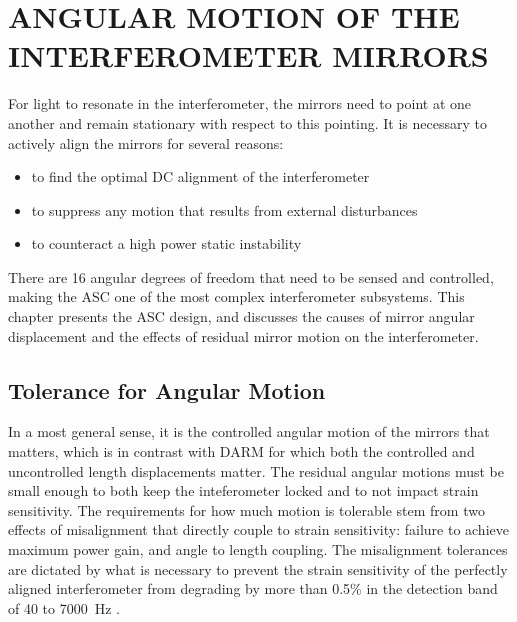 \chapter{ANGULAR MOTION OF THE INTERFEROMETER MIRRORS}

For light to resonate in the interferometer, the mirrors need to point at one another and remain stationary with respect to this pointing. It is necessary to actively align the mirrors for several reasons:
\begin{itemize}
\item to find the optimal DC alignment of the interferometer \vspace{-10 pt}
\item to suppress any motion that results from external disturbances \vspace{-10 pt}
\item to counteract a high power static instability
\end{itemize}
There are 16 angular degrees of freedom that need to be sensed and controlled, making the ASC one of the most complex interferometer subsystems. This chapter presents the ASC design, and discusses the causes of mirror angular displacement and the effects of residual mirror motion on the interferometer. 












\section{Tolerance for Angular Motion}
\label{sec:tolerance}
In a most general sense, it is the controlled angular motion of the mirrors that matters, which is in contrast with DARM for which both the controlled and uncontrolled length displacements matter. The residual angular motions must be small enough to both keep the inteferometer locked and to not impact strain sensitivity. The requirements for how much motion is tolerable stem from two effects of misalignment that directly couple to strain sensitivity: failure to achieve maximum power gain, and angle to length coupling. The misalignment tolerances are dictated by what is necessary to prevent the strain sensitivity of the perfectly aligned interferometer from degrading by more than 0.5\% in the detection band of 40 to 7000~Hz \cite{Fritschel1997Alignment}.

